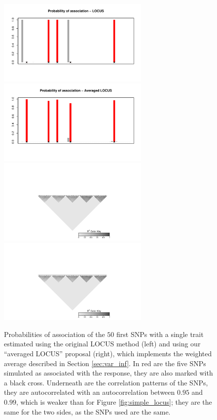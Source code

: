 \documentclass[a4paper, 11pt]{report}
\numberwithin{equation}{chapter}
\begin{document}
\begin{figure}[h]
\centering
\includegraphics[width=2.9in, bb= 0 0 8in 4in]{images/proba_weak.pdf}
\includegraphics[width=2.9in, bb= 0 0 8in 4in]{images/proba_weak_m.pdf}
\includegraphics[width=2.9in, bb= 1.32in 0 6.4in 2in]{images/LD_weak.pdf}
\includegraphics[width=2.9in, bb= 1.32in 0 6.4in 2in]{images/LD_weak.pdf}
\caption{\label{fig:weaker_locus}Probabilities of association of the $50$ first SNPs with a single trait estimated using the original LOCUS method (left) and using our ``averaged LOCUS'' proposal (right), which implements the weighted average described in Section \ref{sec:var_inf}. In red are the five SNPs simulated as associated with the response, they are also marked with a black cross. Underneath are the correlation patterns of the SNPs, they are autocorrelated with an autocorrelation between $0.95$ and $0.99$, which is weaker than for Figure \ref{fig:simple_locus}; they are the same for the two sides, as the SNPs used are the same.}
\end{figure}
\end{document}
